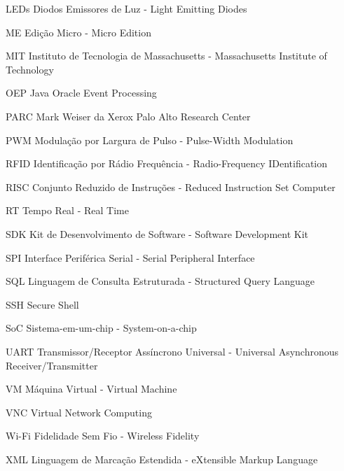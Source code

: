 \begin{siglas}
    \item[LEDs] Diodos Emissores de Luz - Light Emitting Diodes
    \item[ME] Edição Micro - Micro Edition
    \item[MIT] Instituto de Tecnologia de Massachusetts - Massachusetts
    Institute of Technology
    \item[OEP] Java Oracle Event Processing
    \item[PARC] Mark Weiser da Xerox Palo Alto Research Center
    \item[PWM] Modulação por Largura de Pulso - Pulse-Width Modulation
    \item[RFID] Identificação por Rádio Frequência - Radio-Frequency
    IDentification
    \item[RISC] Conjunto Reduzido de Instruções - Reduced Instruction Set
    Computer
    \item[RT] Tempo Real - Real Time
    \item[SDK] Kit de Desenvolvimento de Software - Software Development Kit
    \item[SPI] Interface Periférica Serial - Serial Peripheral Interface
    \item[SQL] Linguagem de Consulta Estruturada - Structured Query Language
    \item[SSH] Secure Shell
    \item[SoC] Sistema-em-um-chip - System-on-a-chip
    \item[UART] Transmissor/Receptor Assíncrono Universal - Universal
    Asynchronous Receiver/Transmitter
    \item[VM] Máquina Virtual - Virtual Machine
    \item[VNC] Virtual Network Computing
    \item[Wi-Fi] Fidelidade Sem Fio - Wireless Fidelity
    \item[XML] Linguagem de Marcação Estendida - eXtensible Markup Language
\end{siglas}
